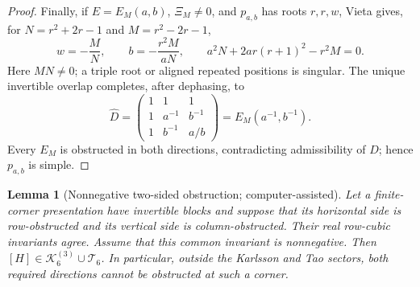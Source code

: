 \documentclass[aps,prx,reprint,nofootinbib,twoside,superscriptaddress,longbibliography,floatfix]{revtex4-2}
\newtheorem{lemma}[theorem]{Lemma}
\theoremstyle{definition}
\newcommand{\KK}{\mathcal K}
\begin{document}
\begin{proof}
{Finally, if $E=E_M(a,b)$, $\Xi_M\ne0$, and $p_{a,b}$ has roots $r,r,w$, Vieta gives, for $N=r^2+2r-1$ and $M=r^2-2r-1$,}
\begin{equation}
{w=-\frac{M}{N},\qquad
b=-\frac{r^2M}{aN},\qquad
a^2N+2ar(r+1)^2-r^2M=0.}
\label{eq:supp-main-repeated-root-relations}
\end{equation}
{Here $MN\ne0$; a triple root or aligned repeated positions is singular.  The unique invertible overlap completes, after dephasing, to}
\begin{equation}
{\widehat D=
\begin{pmatrix}1&1&1\\1&a^{-1}&b^{-1}\\1&b^{-1}&a/b\end{pmatrix}
=E_M(a^{-1},b^{-1}).}
\label{eq:supp-main-repeated-opposite}
\end{equation}
{Every $E_M$ is obstructed in both directions, contradicting admissibility of $D$; hence $p_{a,b}$ is simple.}
\end{proof}


\begin{lemma}[{Nonnegative two-sided obstruction; computer-assisted}]
\label{lem:supp-two-sided-badness}
{Let a finite-corner presentation have invertible blocks and suppose that its horizontal side is row-obstructed and its vertical side is column-obstructed. Their real row-cubic invariants agree. Assume that this common invariant is nonnegative. Then $[H]\in\KK_6^{(3)}\cup\mathcal T_6$. In particular, outside the Karlsson and Tao sectors, both required directions cannot be obstructed at such a corner.}
\end{lemma}
\end{document}
